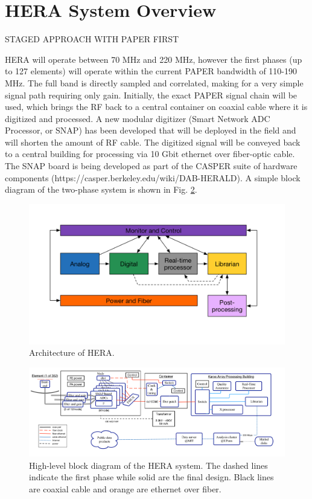 \documentclass{article}
\begin{document}
\section{HERA System Overview}
\label{sec:system}
STAGED APPROACH WITH PAPER FIRST

HERA will operate between 70 MHz and 220 MHz, however the first phases (up to 127 elements) will operate within the current PAPER bandwidth of 110-190 MHz.  The full band is directly sampled and correlated, making for a very simple signal path requiring only gain.  Initially, the exact PAPER signal chain will be used, which brings the RF back to a central container on coaxial cable where it is digitized and processed.  A new modular digitizer (Smart Network ADC Processor, or SNAP) has been developed that will be deployed in the field and will shorten the amount of RF cable.  The digitized signal will be conveyed back to a central building for processing via 10 Gbit ethernet over fiber-optic cable.   The SNAP board is being developed as part of the CASPER suite of hardware components (https://casper.berkeley.edu/wiki/DAB-HERALD).  A simple block diagram of the two-phase system is shown in Fig. \ref{fig:system}.

\begin{figure}[t]
\centerline{
\includegraphics[width=\textwidth]{plots/sysOver.png} }
\caption{\small Architecture of HERA.
\label{fig:architecture}}
\end{figure}

\begin{figure}[t]
\centerline{
\includegraphics[width=\textwidth]{plots/HERA_high_level_block_diagram.png} }
\caption{\small High-level block diagram of the HERA system.  The dashed lines indicate the first phase while solid are the final design.  Black lines are coaxial cable and orange are ethernet over fiber.
\label{fig:system}}
\end{figure}
\end{document}
